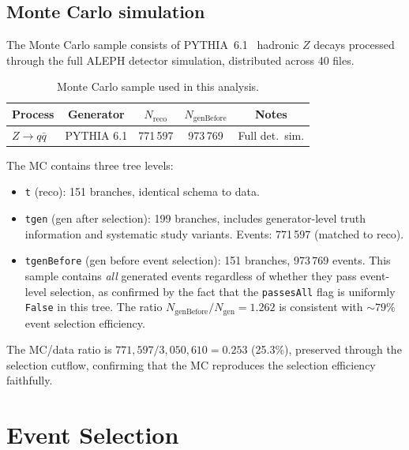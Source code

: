 \documentclass[11pt,a4paper]{article}
\begin{document}
\subsection{Monte Carlo simulation}
\label{sec:data-mc}

The Monte Carlo sample consists of PYTHIA~6.1~\cite{Sjostrand:2000wi}
hadronic $Z$ decays processed through the full ALEPH detector
simulation, distributed across 40 files.

\begin{table}[htbp]
\centering
\caption{Monte Carlo sample used in this analysis.}
\label{tbl:mc}
\begin{tabular}{lcccc}
\toprule
Process & Generator & $N_\text{reco}$ & $N_\text{genBefore}$
  & Notes \\
\midrule
$Z \to q\bar{q}$ & PYTHIA 6.1 & 771\,597 & 973\,769
  & Full det.\ sim. \\
\bottomrule
\end{tabular}
\end{table}

The MC contains three tree levels:
\begin{itemize}
\item \texttt{t} (reco): 151 branches, identical schema to data.
\item \texttt{tgen} (gen after selection): 199 branches, includes
  generator-level truth information and systematic study variants.
  Events: 771\,597 (matched to reco).
\item \texttt{tgenBefore} (gen before event selection): 151 branches,
  973\,769 events.  This sample contains \emph{all} generated events
  regardless of whether they pass event-level selection, as confirmed by
  the fact that the \texttt{passesAll} flag is uniformly \texttt{False}
  in this tree.  The ratio $N_\text{genBefore}/N_\text{gen} = 1.262$
  is consistent with $\sim\!79\%$ event selection efficiency.
\end{itemize}

The MC/data ratio is $771{,}597 / 3{,}050{,}610 = 0.253$ (25.3\%),
preserved through the selection cutflow, confirming that the MC
reproduces the selection efficiency faithfully.

\section{Event Selection}
\label{sec:selection}
\end{document}
